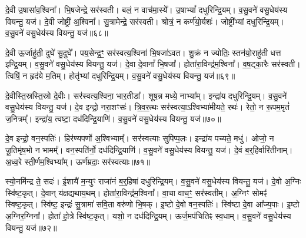 दे॒वी उ॒षासा॑व॒श्विना᳚।
भि॒षजेन्द्रे॒ सर॑स्वती।
बलं॒ न वाच॑मा॒स्ये᳚।
उ॒षाभ्यां᳚ दधुरिन्द्रि॒यम्।
व॒सु॒वने॑ वसु॒धेय॑स्य वियन्तु॒ यज॑।
दे॒वी जोष्ट्री॑ अ॒श्विना᳚।
सु॒त्रामेन्द्रे॒ सर॑स्वती।
श्रोत्रं॒ न कर्ण॑यो॒र्यशः॑।
जोष्ट्री᳚भ्यां दधुरिन्द्रि॒यम्।
व॒सु॒वने॑ वसु॒धेय॑स्य वियन्तु॒ यज॑॥६८॥

दे॒वी ऊ॒र्जाहु॑ती॒ दुघे॑ सु॒दुघे᳚।
पय॒सेन्द्र॒ꣳ॒ सर॑स्वत्य॒श्विना॑ भि॒षजा॑ऽवत।
शु॒क्रं न ज्योतिः॒ स्तन॑यो॒राहु॑ती धत्त इन्द्रि॒यम्।
व॒सु॒वने॑ वसु॒धेय॑स्य वियन्तु॒ यज॑।
दे॒वा दे॒वानां᳚ भि॒षजा᳚।
होता॑रा॒विन्द्र॑म॒श्विना᳚।
व॒ष॒ट्का॒रैः सर॑स्वती।
त्विषिं॒ न हृद॑ये म॒तिम्।
होतृ॑भ्यां दधुरिन्द्रि॒यम्।
व॒सु॒वने॑ वसु॒धेय॑स्य वियन्तु॒ यज॑॥६९॥

दे॒वीस्ति॒स्रस्ति॒स्रो दे॒वीः।
सर॑स्वत्य॒श्विना॒ भार॒तीडा᳚।
शूष॒न्न मध्ये॒ नाभ्या᳚म्।
इन्द्रा॑य दधुरिन्द्रि॒यम्।
व॒सु॒वने॑ वसु॒धेय॑स्य वियन्तु॒ यज॑।
दे॒व इन्द्रो॒ नरा॒शꣳसः॑।
त्रि॒व॒रू॒थः सर॑स्वत्या॒\-ऽश्विभ्या॑मीयते॒ रथः॑।
रेतो॒ न रू॒पम॒मृतं॑ ज॒नित्रम्᳚।
इन्द्रा॑य॒ त्वष्टा॒ दध॑दिन्द्रि॒याणि॑।
व॒सु॒वने॑ वसु॒धेय॑स्य वियन्तु॒ यज॑॥७०॥

दे॒व इन्द्रो॒ वन॒स्पतिः॑।
हिर॑ण्यपर्णो अ॒श्विभ्याम्᳚।
सर॑स्वत्याः सुपिप्प॒लः।
इन्द्रा॑य पच्यते॒ मधु॑।
ओजो॒ न जू॒तिमृ॑ष॒भो न भामम्᳚।
वन॒स्पति॑र्नो॒ दध॑दिन्द्रि॒याणि॑।
व॒सु॒वने॑ वसु॒धेय॑स्य वियन्तु॒ यज॑।
दे॒वं ब॒र्॒हिर्वारि॑तीनाम्।
अ॒ध्व॒रे स्ती॒र्णम॒श्विभ्या᳚म्।
ऊर्ण॑म्रदाः॒ सर॑स्वत्याः॥७१॥

स्यो॒नमि॑न्द्र ते॒ सदः॑।
ई॒शायै॑ म॒न्युꣳ राजा॑नं ब॒र्॒हिषा॑ दधुरिन्द्रि॒यम्।
व॒सु॒वने॑ वसु॒धेय॑स्य वियन्तु॒ यज॑।
दे॒वो अ॒ग्निः स्वि॑ष्ट॒कृत्।
दे॒वान् य॑क्षद्यथाय॒थम्।
होता॑रा॒विन्द्र॑म॒श्विना᳚।
वा॒चा वाच॒ꣳ॒ सर॑स्वतीम्।
अ॒ग्निꣳ सोमꣴ॑ स्विष्ट॒कृत्।
स्वि॑ष्ट॒ इन्द्रः॑ सु॒त्रामा॑ सवि॒ता वरु॑णो भि॒षक्।
इ॒ष्टो दे॒वो वन॒स्पतिः॑।
स्वि॑ष्टा दे॒वा आ᳚ज्य॒पाः।
इ॒ष्टो अ॒ग्निर॒ग्निना᳚।
होता॑ हो॒त्रे स्वि॑ष्ट॒कृत्।
यशो॒ न दध॑दिन्द्रि॒यम्।
ऊर्ज॒मप॑चितिꣴ स्व॒धाम्।
व॒सु॒वने॑ वसु॒धेय॑स्य वियन्तु॒ यज॑॥७२॥

